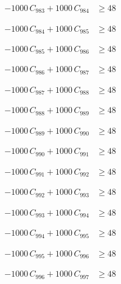 \documentclass[a4paper,11pt]{article}
\begin{document}
\begin{align}
-1000\,C_{983} + 1000\,C_{984} &\geq 48 \nonumber
\end{align}

\begin{align}
-1000\,C_{984} + 1000\,C_{985} &\geq 48 \nonumber
\end{align}

\begin{align}
-1000\,C_{985} + 1000\,C_{986} &\geq 48 \nonumber
\end{align}

\begin{align}
-1000\,C_{986} + 1000\,C_{987} &\geq 48 \nonumber
\end{align}

\begin{align}
-1000\,C_{987} + 1000\,C_{988} &\geq 48 \nonumber
\end{align}

\begin{align}
-1000\,C_{988} + 1000\,C_{989} &\geq 48 \nonumber
\end{align}

\begin{align}
-1000\,C_{989} + 1000\,C_{990} &\geq 48 \nonumber
\end{align}

\begin{align}
-1000\,C_{990} + 1000\,C_{991} &\geq 48 \nonumber
\end{align}

\begin{align}
-1000\,C_{991} + 1000\,C_{992} &\geq 48 \nonumber
\end{align}

\begin{align}
-1000\,C_{992} + 1000\,C_{993} &\geq 48 \nonumber
\end{align}

\begin{align}
-1000\,C_{993} + 1000\,C_{994} &\geq 48 \nonumber
\end{align}

\begin{align}
-1000\,C_{994} + 1000\,C_{995} &\geq 48 \nonumber
\end{align}

\begin{align}
-1000\,C_{995} + 1000\,C_{996} &\geq 48 \nonumber
\end{align}

\begin{align}
-1000\,C_{996} + 1000\,C_{997} &\geq 48 \nonumber
\end{align}
\end{document}
